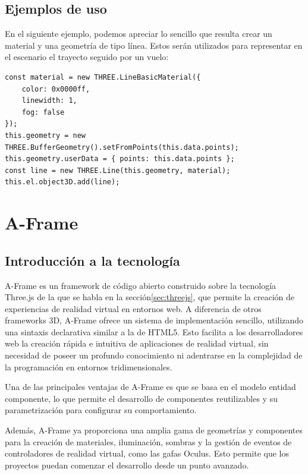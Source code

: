 \documentclass[a4paper, 11pt]{book}
\begin{document}
\subsection{Ejemplos de uso}
En el siguiente ejemplo, podemos apreciar lo sencillo que resulta crear un material y una geometría de tipo línea. Estos serán utilizados para representar en el escenario el trayecto seguido por un vuelo:
\begin{verbatim}
const material = new THREE.LineBasicMaterial({
    color: 0x0000ff,
    linewidth: 1,
    fog: false
});
this.geometry = new THREE.BufferGeometry().setFromPoints(this.data.points);
this.geometry.userData = { points: this.data.points };
const line = new THREE.Line(this.geometry, material);
this.el.object3D.add(line);
\end{verbatim}
\section{A-Frame}
\label{sec:aframe}
\subsection{Introducción a la tecnología}
A-Frame\cite{aframedocs} es un framework de código abierto construido sobre la tecnología Three.js de la que se habla en la sección\ref{sec:threejs}, que permite la creación de experiencias de realidad virtual en entornos web. A diferencia de otros frameworks 3D, A-Frame ofrece un sistema de implementación sencillo, utilizando una sintaxis declarativa similar a la de HTML5. Esto facilita a los desarrolladores web la creación rápida e intuitiva de aplicaciones de realidad virtual, sin necesidad de poseer un profundo conocimiento ni adentrarse en la complejidad de la programación en entornos tridimensionales.

Una de las principales ventajas de A-Frame es que se basa en el modelo entidad componente, lo que permite el desarrollo de componentes reutilizables y su parametrización para configurar su comportamiento.

Además, A-Frame ya proporciona una amplia gama de geometrías y componentes para la creación de materiales, iluminación, sombras y la gestión de eventos de controladores de realidad virtual, como las gafas Oculus. Esto permite que los proyectos puedan comenzar el desarrollo desde un punto avanzado.
\end{document}
